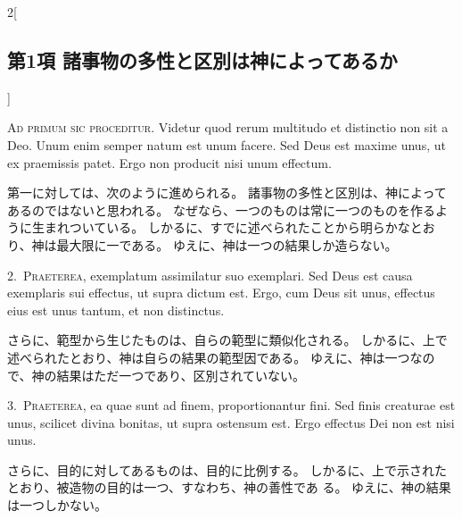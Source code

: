 \documentclass[paper=a4paper,fontsize=10pt,jafontsize=9pt,titlepage]{jlreq}
\begin{document}
\begin{paracol}{2}[\subsection{第1項 諸事物の多性と区別は神によってあるか}]

{\huge A}{\scshape d primum sic proceditur}. Videtur quod
 rerum multitudo et distinctio non sit a Deo. Unum enim semper natum est
 unum facere. Sed Deus est maxime unus, ut ex praemissis patet. Ergo non
 producit nisi unum effectum.


\switchcolumn


第一に対しては、次のように進められる。
諸事物の多性と区別は、神によってあるのではないと思われる。
なぜなら、一つのものは常に一つのものを作るように生まれついている。
しかるに、すでに述べられたことから明らかなとおり、神は最大限に一である。
ゆえに、神は一つの結果しか造らない。




2.~{\scshape Praeterea}, exemplatum assimilatur suo
 exemplari. Sed Deus est causa exemplaris sui effectus, ut supra dictum
 est. Ergo, cum Deus sit unus, effectus eius est unus tantum, et non
 distinctus.


\switchcolumn


さらに、範型から生じたものは、自らの範型に類似化される。
しかるに、上で述べられたとおり、神は自らの結果の範型因である。
ゆえに、神は一つなので、神の結果はただ一つであり、区別されていない。




3.~{\scshape Praeterea}, ea quae sunt ad finem,
 proportionantur fini. Sed finis creaturae est unus, scilicet divina
 bonitas, ut supra ostensum est. Ergo effectus Dei non est nisi unus.


\switchcolumn


さらに、目的に対してあるものは、目的に比例する。
しかるに、上で示されたとおり、被造物の目的は一つ、すなわち、神の善性であ
 る。
ゆえに、神の結果は一つしかない。


\switchcolumn*[\subsection{s.c.}]



\end{paracol}
\end{document}
